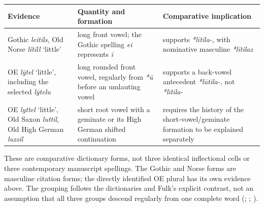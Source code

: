 \documentclass[
  british,
  a4paper,
]{article}
\newcounter{none} %
\begin{document}
{\def\LTcaptype{none} %
\begin{longtable}[]{@{}
  >{\raggedright\arraybackslash}p{}
  >{\raggedright\arraybackslash}p{}
  >{\raggedright\arraybackslash}p{}@{}}
\toprule\noalign{}
\begin{minipage}[b]{\linewidth}\raggedright
Evidence
\end{minipage} & \begin{minipage}[b]{\linewidth}\raggedright
Quantity and formation
\end{minipage} & \begin{minipage}[b]{\linewidth}\raggedright
Comparative implication
\end{minipage} \\
\midrule\noalign{}
\endhead
\bottomrule\noalign{}
\endlastfoot
Gothic \emph{leitils}, Old Norse \emph{lítill} `little' & long front
vowel; the Gothic spelling \emph{ei} represents \emph{ī} & supports
\emph{*lītila-}, with nominative masculine \emph{*lītilaz} \\
OE \emph{lȳtel} `little', including the selected \emph{lȳtelu} & long
rounded front vowel, regularly from \emph{*ū} before an umlauting vowel
& supports a back-vowel antecedent \emph{*lūtila-}, not
\emph{*lītila-} \\
OE \emph{lyttel} `little', Old Saxon \emph{luttil}, Old High German
\emph{luzzil} & short root vowel with a geminate or its High German
shifted continuation & requires the history of the short-vowel/geminate
formation to be explained separately \\
\end{longtable}
}

These are comparative dictionary forms, not three identical inflectional
cells or three contemporary manuscript spellings. The Gothic and Norse
forms are masculine citation forms; the directly identified OE plural
has its own evidence above. The grouping follows the dictionaries and
Fulk's explicit contrast, not an assumption that all three groups
descend regularly from one complete word (; ;
).
\end{document}
